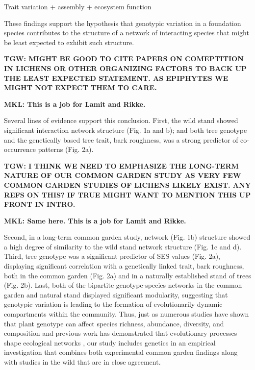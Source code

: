 \documentclass[9pt,twocolumn,twoside,lineno]{pnas-new}
\begin{document}
Trait variation + assembly + ecosystem function

These findings support the hypothesis that genotypic variation in a
foundation species contributes to the structure of a network of
interacting species that might be least expected to exhibit such
structure. 

\textbf{TGW: MIGHT BE GOOD TO CITE PAPERS ON COMEPTITION IN LICHENS OR
OTHER ORGANIZING FACTORS TO BACK UP THE LEAST EXPECTED STATEMENT.  AS
EPIPHYTES WE MIGHT NOT EXPECT THEM TO CARE.}

\textbf{MKL: This is a job for Lamit and Rikke.}

Several lines of evidence support this conclusion. First, the wild
stand showed significant interaction network structure (Fig. 1a and
b); and both tree genotype and the genetically based tree trait, bark
roughness, was a strong predictor of co-occurrence patterns
(Fig. 2a). 

\textbf{TGW: I THINK WE NEED TO EMPHASIZE THE LONG-TERM NATURE OF OUR
COMMON GARDEN STUDY AS VERY FEW COMMON GARDEN STUDIES OF LICHENS
LIKELY EXIST. ANY REFS ON THIS? IF TRUE MIGHT WANT TO MENTION THIS UP
FRONT IN INTRO.}

\textbf{MKL: Same here. This is a job for Lamit and Rikke.}

Second, in a long-term common garden study, network
(Fig. 1b) structure showed a high degree of similarity to the wild
stand network structure (Fig. 1c and d). Third, tree genotype was a
significant predictor of SES values (Fig. 2a), displaying significant
correlation with a genetically linked trait, bark roughness, both in
the common garden (Fig. 2a) and in a naturally established stand of
trees (Fig. 2b). Last, both of the bipartite genotype-species networks
in the common garden and natural stand displayed significant
modularity, suggesting that genotypic variation is leading to the
formation of evolutionarily dynamic compartments within the
community. Thus, just as numerous studies have shown that plant
genotype can affect species richness, abundance, diversity, and
composition and previous work has demonstrated that evolutionary
processes shape ecological networks \cite{Guimaraes2011,
  Moya-Larano2011}, our study includes genetics in an empirical
investigation that combines both experimental common garden findings
along with studies in the wild that are in close agreement.
\end{document}
